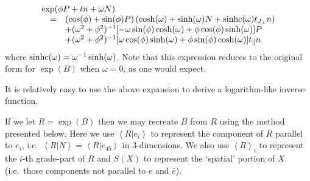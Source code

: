 \[
\begin{array}{rl}
\multicolumn{2}{l}{\exp(\phi P + tn + \omega N)}\\
\quad = & \left(\cos(\phi) + \sin(\phi)P\right)\left(\cosh(\omega) +
		\sinh(\omega)N + \sinhc(\omega)t_\Jperp n\right)\\
&+ (\omega^2 + \phi^2)^{-1} [-\omega\sin(\phi)\cosh(\omega)+\phi\cos(\phi)\sinh(\omega)]P\\
&+ (\omega^2 + \phi^2)^{-1} [\omega\cos (\phi)\sinh (\omega) + \phi \sin(\phi)\cosh(\omega)] t_\parallel n \\
	\end{array}
\]
where $\mathrm{sinhc}(\omega) = \omega^{-1}\sinh(\omega)$. Note that this expression reduces to 
the original form for $\exp(B)$ when $\omega = 0$, as one would expect.

It is relatively easy to use the above expansion to derive a logarithm-like inverse 
function. 

If we let $R = \exp(B)$ then we may recreate $B$ from $R$ using the method 
presented
below. Here we use $\left<R|e_i\right>$ to represent the component of $R$
parallel to $e_i$, i.e.\ $\left<R|N\right> = \left<R|e_{45}\right>$ in 
3-dimensions. We also use $\left<R\right>_i$ to represent the 
$i$-th grade-part of $R$ and $S(X)$ to represent the 
`spatial' portion of $X$ (i.e.\ those components not parallel to $e$ and 
$\bar{e}$).


